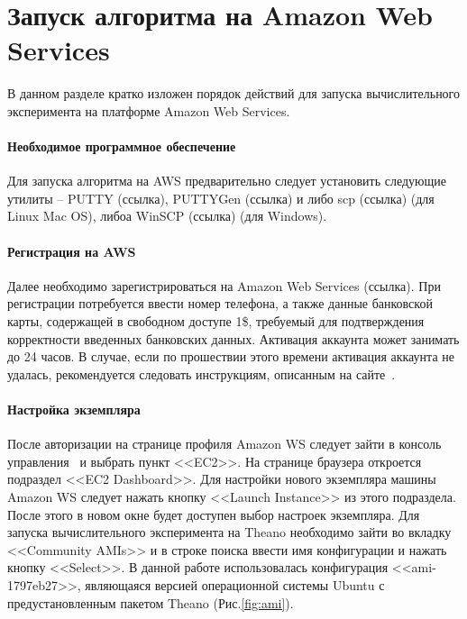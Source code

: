 \documentclass[12pt,twoside]{article}
\begin{document}
\section{Запуск алгоритма на Amazon Web Services}
В данном разделе кратко изложен порядок действий для запуска вычислительного эксперимента на платформе Amazon Web Services.
\paragraph{Необходимое программное обеспечение}
Для запуска алгоритма на AWS предварительно следует установить следующие утилиты -- PUTTY (ссылка), PUTTYGen (ссылка) и либо scp (ссылка) (для Linux Mac OS), либоа WinSCP (ссылка) (для Windows).
\paragraph{Регистрация на AWS}
Далее необходимо зарегистрироваться на Amazon Web Services (ссылка). При регистрации потребуется ввести номер телефона, а также данные банковской карты, содержащей в свободном доступе 1\$, требуемый для подтверждения корректности введенных банковских данных. Активация аккаунта может занимать до 24 часов. В случае, если по прошествии этого времени активация аккаунта не удалась, рекомендуется следовать инструкциям, описанным на сайте~\cite{bank}.
\paragraph{Настройка экземпляра}
После авторизации на странице профиля Amazon WS следует зайти в консоль управления~\cite{console} и выбрать пункт <<EC2>>. На странице браузера откроется подраздел <<EC2 Dashboard>>. Для настройки нового экземпляра машины Amazon WS следует нажать кнопку <<Launch Instance>> из этого подраздела. После этого в новом окне будет доступен выбор настроек экземпляра. Для запуска вычислительного эксперимента на Theano необходимо зайти во вкладку <<Community AMIs>> и в строке поиска ввести имя конфигурации и нажать кнопку <<Select>>. В данной работе использовалась конфигурация <<ami-1797eb27>>, являющаяся версией операционной системы Ubuntu с предустановленным пакетом Theano (Рис.\ref{fig:ami}).
\end{document}
